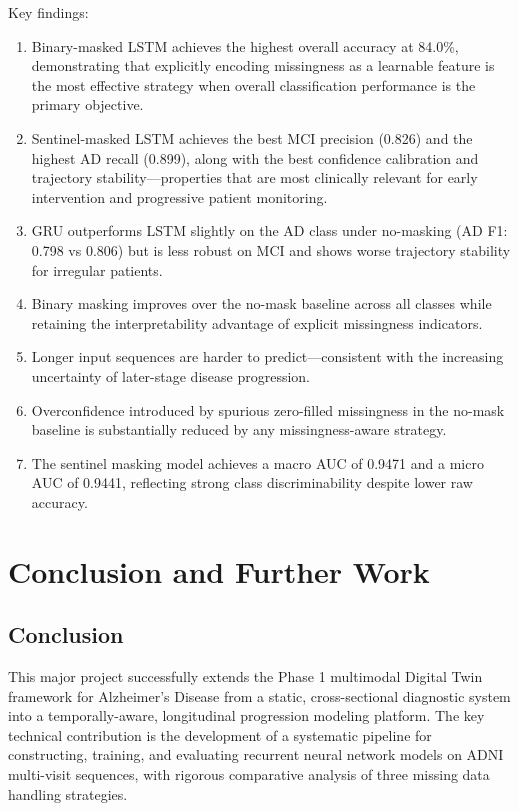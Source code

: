 \documentclass[12pt,singleside,a4paper]{article}
\begin{document}
Key findings:
\begin{enumerate}
    \item Binary-masked LSTM achieves the highest overall accuracy at 84.0\%, demonstrating that explicitly encoding missingness as a learnable feature is the most effective strategy when overall classification performance is the primary objective.
    \item Sentinel-masked LSTM achieves the best MCI precision (0.826) and the highest AD recall (0.899), along with the best confidence calibration and trajectory stability—properties that are most clinically relevant for early intervention and progressive patient monitoring.
    \item GRU outperforms LSTM slightly on the AD class under no-masking (AD F1: 0.798 vs 0.806) but is less robust on MCI and shows worse trajectory stability for irregular patients.
    \item Binary masking improves over the no-mask baseline across all classes while retaining the interpretability advantage of explicit missingness indicators.
    \item Longer input sequences are harder to predict—consistent with the increasing uncertainty of later-stage disease progression.
    \item Overconfidence introduced by spurious zero-filled missingness in the no-mask baseline is substantially reduced by any missingness-aware strategy.
    \item The sentinel masking model achieves a macro AUC of 0.9471 and a micro AUC of 0.9441, reflecting strong class discriminability despite lower raw accuracy.
\end{enumerate}

\pagebreak
\section{Conclusion and Further Work}

\subsection{Conclusion}

This major project successfully extends the Phase 1 multimodal Digital Twin framework for Alzheimer's Disease from a static, cross-sectional diagnostic system into a temporally-aware, longitudinal progression modeling platform. The key technical contribution is the development of a systematic pipeline for constructing, training, and evaluating recurrent neural network models on ADNI multi-visit sequences, with rigorous comparative analysis of three missing data handling strategies.
\end{document}

